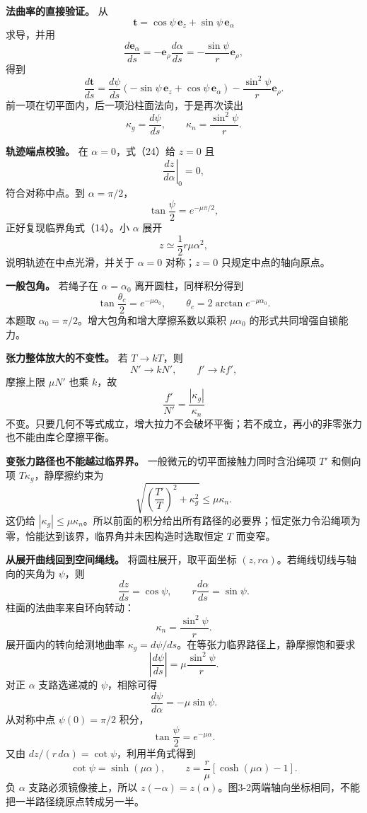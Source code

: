 \documentclass[12pt,a4paper,UTF8]{ctexart}
\begin{document}
\textbf{法曲率的直接验证。} 从 \[
\bm t=\cos\psi\,\bm e_z+\sin\psi\,\bm e_\alpha
\] 求导，并用 \[
\frac{d\bm e_\alpha}{ds}
=-\bm e_\rho\frac{d\alpha}{ds}
=-\frac{\sin\psi}{r}\bm e_\rho,
\] 得到 \[
\frac{d\bm t}{ds}
=\frac{d\psi}{ds}
(-\sin\psi\,\bm e_z+\cos\psi\,\bm e_\alpha)
-\frac{\sin^2\psi}{r}\bm e_\rho.
\] 前一项在切平面内，后一项沿柱面法向，于是再次读出 \[
\kappa_g=\frac{d\psi}{ds},
\qquad
\kappa_n=\frac{\sin^2\psi}{r}.
\]

\textbf{轨迹端点校验。} 在 \(\alpha=0\)，式（24）给 \(z=0\) 且 \[
\left.\frac{dz}{d\alpha}\right|_0=0,
\] 符合对称中点。到 \(\alpha=\pi/2\)， \[
\tan\frac{\psi}{2}=e^{-\mu\pi/2},
\] 正好复现临界角式（14）。小 \(\alpha\) 展开 \[
z\simeq\frac12r\mu\alpha^2,
\] 说明轨迹在中点光滑，并关于 \(\alpha=0\) 对称；\(z=0\)
只规定中点的轴向原点。

\textbf{一般包角。} 若绳子在 \(\alpha=\alpha_0\) 离开圆柱，同样积分得到
\[
\tan\frac{\theta_c}{2}=e^{-\mu\alpha_0},
\qquad
\theta_c=2\arctan e^{-\mu\alpha_0}.
\] 本题取 \(\alpha_0=\pi/2\)。增大包角和增大摩擦系数以乘积
\(\mu\alpha_0\) 的形式共同增强自锁能力。

\textbf{张力整体放大的不变性。} 若 \(T\to kT\)，则 \[
N'\to kN',\qquad f'\to kf',
\] 摩擦上限 \(\mu N'\) 也乘 \(k\)，故 \[
\frac{f'}{N'}=\frac{|\kappa_g|}{\kappa_n}
\]
不变。只要几何不等式成立，增大拉力不会破坏平衡；若不成立，再小的非零张力也不能由库仑摩擦平衡。

\textbf{变张力路径也不能越过临界界。} 一般微元的切平面接触力同时含沿绳项
\(T'\) 和侧向项 \(T\kappa_g\)，静摩擦约束为 \[
\sqrt{\left(\frac{T'}T\right)^2+\kappa_g^2}\le\mu\kappa_n.
\] 这仍给
\(|\kappa_g|\le\mu\kappa_n\)。所以前面的积分给出所有路径的必要界；恒定张力令沿绳项为零，恰能达到该界，临界角并未因构造时选取恒定
\(T\) 而变窄。

\textbf{从展开曲线回到空间绳线。} 将圆柱展开，取平面坐标
\((z,r\alpha)\)。若绳线切线与轴向的夹角为 \(\psi\)，则 \[
\frac{dz}{ds}=\cos\psi,\qquad
r\frac{d\alpha}{ds}=\sin\psi.
\] 柱面的法曲率来自环向转动： \[
\kappa_n=\frac{\sin^2\psi}{r}.
\] 展开面内的转向给测地曲率
\(\kappa_g=d\psi/ds\)。在等张力临界路径上，静摩擦饱和要求 \[
\left|\frac{d\psi}{ds}\right|=\mu\frac{\sin^2\psi}{r}.
\] 对正 \(\alpha\) 支路选递减的 \(\psi\)，相除可得 \[
\frac{d\psi}{d\alpha}=-\mu\sin\psi.
\] 从对称中点 \(\psi(0)=\pi/2\) 积分， \[
\tan\frac\psi2=e^{-\mu\alpha}.
\] 又由 \(dz/(r\,d\alpha)=\cot\psi\)，利用半角式得到 \[
\cot\psi=\sinh(\mu\alpha),\qquad
z=\frac r\mu[\cosh(\mu\alpha)-1].
\] 负 \(\alpha\) 支路必须镜像接上，所以
\(z(-\alpha)=z(\alpha)\)。图3-2两端轴向坐标相同，不能把一半路径绕原点转成另一半。
\end{document}
